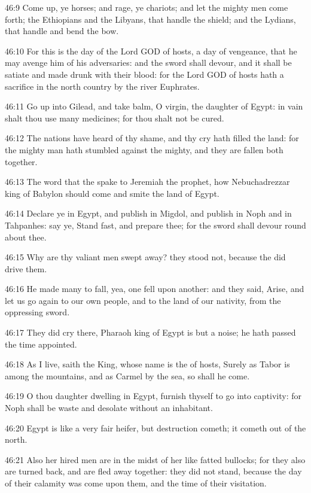 46:9 Come up, ye horses; and rage, ye chariots; and let the mighty men come forth; the Ethiopians and the Libyans, that handle the shield; and the Lydians, that handle and bend the bow.

46:10 For this is the day of the Lord GOD of hosts, a day of vengeance, that he may avenge him of his adversaries: and the sword shall devour, and it shall be satiate and made drunk with their blood: for the Lord GOD of hosts hath a sacrifice in the north country by the river Euphrates.

46:11 Go up into Gilead, and take balm, O virgin, the daughter of Egypt: in vain shalt thou use many medicines; for thou shalt not be cured.

46:12 The nations have heard of thy shame, and thy cry hath filled the land: for the mighty man hath stumbled against the mighty, and they are fallen both together.

46:13 The word that the \LORD spake to Jeremiah the prophet, how Nebuchadrezzar king of Babylon should come and smite the land of Egypt.

46:14 Declare ye in Egypt, and publish in Migdol, and publish in Noph and in Tahpanhes: say ye, Stand fast, and prepare thee; for the sword shall devour round about thee.

46:15 Why are thy valiant men swept away? they stood not, because the \LORD did drive them.

46:16 He made many to fall, yea, one fell upon another: and they said, Arise, and let us go again to our own people, and to the land of our nativity, from the oppressing sword.

46:17 They did cry there, Pharaoh king of Egypt is but a noise; he hath passed the time appointed.

46:18 As I live, saith the King, whose name is the \LORD of hosts, Surely as Tabor is among the mountains, and as Carmel by the sea, so shall he come.

46:19 O thou daughter dwelling in Egypt, furnish thyself to go into captivity: for Noph shall be waste and desolate without an inhabitant.

46:20 Egypt is like a very fair heifer, but destruction cometh; it cometh out of the north.

46:21 Also her hired men are in the midst of her like fatted bullocks; for they also are turned back, and are fled away together: they did not stand, because the day of their calamity was come upon them, and the time of their visitation.

